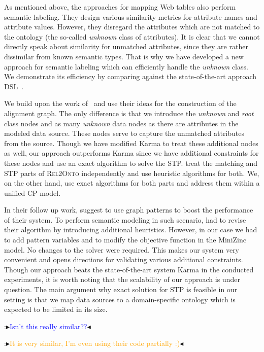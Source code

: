 \documentclass[letterpaper]{article} %
\newcommand{\authornote}[3]{
  {\fbox{\sc 
  #1}:$\blacktriangleright$\textcolor{#2}{\small{#3}}$\blacktriangleleft$}%
}
\newcommand{\ddg}[1]{\authornote{DDG}{blue}{#1}}
\newcommand{\npr}[1]{\authornote{NPR}{orange}{#1}}
\newcommand{\relonto}{\textsc{Rel2Onto}}
\begin{document}
As mentioned above, the approaches for mapping Web tables also perform semantic labeling.
They design various similarity metrics for attribute names and attribute values.
However, they disregard the attributes which are not matched to the ontology (the so-called \emph{unknown} class of attributes).
It is clear that we cannot directly speak about similarity for unmatched attributes, since they are rather dissimilar from known semantic types.
That is why we have developed a new approach for semantic labeling which can efficiently handle the \emph{unknown} class.
We demonstrate its efficiency by comparing against the state-of-the-art approach DSL~\cite{Pham:semantic}.

We build upon the work of~\cite{taheriyan2016learning} and use their ideas for the construction of the alignment graph.
The only difference is that we introduce the \emph{unknown} and \emph{root} class nodes and as many \emph{unknown} data nodes as there are attributes in the modeled data source.
These nodes serve to capture the unmatched attributes from the source.
Though we have modified Karma to treat these additional nodes as well, our approach outperforms Karma since we have additional constraints for these nodes and use an exact algorithm to solve the STP.
\cite{taheriyan2016learning} treat the matching and STP parts of \relonto{} independently and use heuristic algorithms for both.
We, on the other hand, use exact algorithms for both parts and address them within a unified CP model.

In their follow up work, \cite{Taheriyan:Leveraging} suggest to use graph patterns to boost the performance of their system.
To perform semantic modeling in such scenario, \cite{Taheriyan:Leveraging} had to revise their algorithm by introducing additional heuristics.
However, in our case we had to add pattern variables and to modify the objective function in the MiniZinc model.
No changes to the solver were required.
This makes our system very convenient and opens directions for validating various additional constraints.
Though our approach beats the state-of-the-art system Karma in the conducted experiments, it is worth noting that the scalability of our approach is under question.
The main argument why exact solution for STP is feasible in our setting is that we map data sources to a domain-specific ontology which is expected to be limited in its size.

\ddg{Isn't this really similar??}
\npr{It is very similar, I'm even using their code partially :)}
\end{document}
